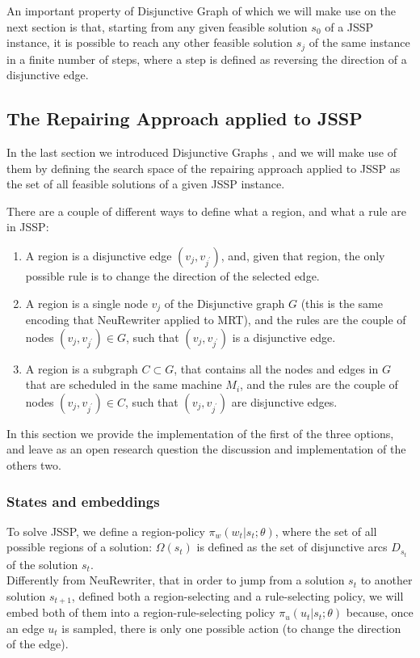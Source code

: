 \documentclass[12pt]{article}
\begin{document}
An important property of Disjunctive Graph of which we will make use on the next section is that, starting from any given feasible solution $s_0$ of a JSSP instance,
 it is possible to reach any other feasible solution $s_j$ of the same instance in a finite number of steps, where a step is defined as reversing the direction of a disjunctive edge.

\subsection{The Repairing Approach applied to JSSP}
In the last section we introduced Disjunctive Graphs \label{sec:disjunctive}, and we will make use of them by defining the search space of the repairing approach 
applied to JSSP as the set of all feasible solutions of a given JSSP instance.

\medbreak
\label{sec:regions}
There are a couple of different ways to define what a region, and what a rule are in JSSP:
\begin{enumerate}
    \item A region is a disjunctive edge $(v_j,v_{j^{'}})$, and, given that region, the only possible rule is to change the direction of the selected edge.
    \item A region is a single node $v_j$ of the Disjunctive graph $G$ (this is the same encoding that NeuRewriter applied to MRT), and the rules are the couple of nodes $(v_j, v_{j^{'}}) \in G$, such that $(v_j, v_{j^{'}})$ is a disjunctive edge.
    \item A region is a subgraph $C \subset G$, that contains all the nodes and edges in $G$ that are scheduled in the same machine $M_i$, and the rules are the couple of nodes $(v_j, v_{j^{'}}) \in C$, such that $(v_j, v_{j^{'}})$ are disjunctive edges.
\end{enumerate}
In this section we provide the implementation of the first of the three options, and leave as an open research question the discussion and implementation of the others two.

\medbreak
\subsubsection{States and embeddings}

To solve JSSP, we define a region-policy $\pi_{w}(w_t|s_t;\theta)$, 
where the set of all possible regions of a solution: $\Omega(s_t)$ is defined as the set of disjunctive arcs $D_{s_t}$ of the solution $s_t$.\\
Differently from NeuRewriter, that in order to jump from a solution $s_t$ to another solution $s_{t+1}$, defined both a region-selecting and a rule-selecting policy, we will embed
 both of them into a region-rule-selecting policy $\pi_{u}(u_t|s_t;\theta)$ because, once an edge $u_t$ is sampled, there is only one possible action (to change the direction of the edge).
\end{document}
